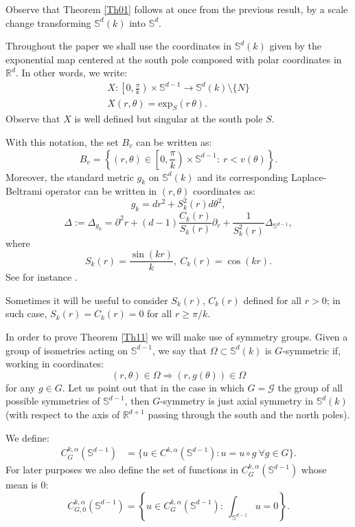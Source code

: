 \documentclass[reqno]{amsart}
\def\S{\mathbb S}
\def\R{\mathbb R}
\def\Sk{\mathbb{S}^{d}(k)}
\numberwithin{equation}{section}
\newenvironment{key words}{\textbf{Keywords}\mbox{  }}{ }
\begin{document}
Observe that Theorem \ref{Th01} follows at once from the previous result, by a scale change transforming $\mathbb{S}^{d}(k)$ into $\mathbb{S}^{d}$.

\medskip

Throughout the paper we shall use the coordinates in $\Sk$ given by the exponential map centered at the south pole composed with polar coordinates in $\R^d$. In other words, we write:
\begin{equation} \label{coord}  \begin{array}{c} X: \left[0, \frac{\pi}{k}\right) \times \S^{d-1} \to \Sk \setminus \{N\} \\
X(r, \theta) = \mbox{exp}_S(r\,  \theta). \end{array} \end{equation}
Observe that $X$ is well defined but singular at the south pole $S$.

\medskip
With this notation, the set $B_v$ can be written as:
$$ B_v=\left\{(r, \theta) \in \left[0, \frac{\pi}{k}\right) \times \S^{d-1}: \  r < v(\theta) \right\}.$$ Moreover, the standard metric $g_k$ on $\Sk$ and its corresponding Laplace-Beltrami operator can be written in $(r, \theta)$ coordinates as:
\[g_k=dr^{2}+S_{k}^{2}(r)d\theta^{2},\]
\[\Delta:=\Delta_{g_{k}}=\partial^{2}r+(d-1)\frac{C_{k}(r)}{S_{k}(r)}\partial_r+\frac{1}{S_{k}^{2}(r)}\Delta_{\mathbb{S}^{d-1}},\]
where \begin{equation} \label{cos-sin} S_{k}(r)=\frac{\sin(kr)}{k}, \ C_{k}(r)=\cos(kr).\end{equation}
See for instance \cite{C84}.

Sometimes it will be useful to consider $S_k(r)$, $C_k(r)$ defined for all $r>0$; in such case, $S_k(r)= C_k(r)=0$ for all $r \geq \pi/k$.

\medskip
In order to prove Theorem \ref{Th11} we will make use of symmetry groups. Given a group of isometries acting on $\mathbb{S}^{d-1}$, we say that $\Omega\subset\mathbb{S}^{d}(k)$ is $G$-symmetric if, working in coordinates:
\[
(r, \theta) \in \Omega \Rightarrow (r, g(\theta)) \in \Omega
\]
for any $g \in G$. Let us point out that in the case in which $G = \mathcal{G}$ the group of all possible symmetries of $\S^{d-1}$, then $G$-symmetry is just axial symmetry in $\Sk$ (with respect to the axis of $\mathbb{R}^{d+1}$ passing through the south and the north poles).

\medskip


We define:
\begin{align*}
	C^{k,\alpha}_{G}(\mathbb{S}^{d-1})&=\{u\in C^{k,\alpha}(\mathbb{S}^{d-1}):u=u\circ g ~\forall g\in G\}.
\end{align*}
For later purposes we also define the set of functions in $C^{k,\alpha}_{G}(\S^{d-1})$ whose mean is $0$:
\[ C^{k,\alpha}_{G,0}(\mathbb{S}^{d-1})= \left \{u\in C^{k,\alpha}_G(\mathbb{S}^{d-1}):\ \int_{\S^{d-1}} u=0 \right \}.	 \]
\end{document}
